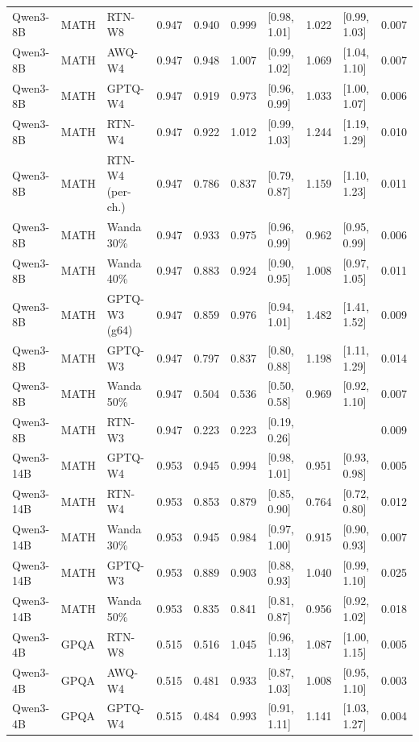 \begin{tabular}{lllrrrlrlr}
Qwen3-8B & MATH & RTN-W8 & 0.947 & 0.940 & 0.999 & [0.98, 1.01] & 1.022 & [0.99, 1.03] & 0.007 \\
Qwen3-8B & MATH & AWQ-W4 & 0.947 & 0.948 & 1.007 & [0.99, 1.02] & 1.069 & [1.04, 1.10] & 0.007 \\
Qwen3-8B & MATH & GPTQ-W4 & 0.947 & 0.919 & 0.973 & [0.96, 0.99] & 1.033 & [1.00, 1.07] & 0.006 \\
Qwen3-8B & MATH & RTN-W4 & 0.947 & 0.922 & 1.012 & [0.99, 1.03] & 1.244 & [1.19, 1.29] & 0.010 \\
Qwen3-8B & MATH & RTN-W4 (per-ch.) & 0.947 & 0.786 & 0.837 & [0.79, 0.87] & 1.159 & [1.10, 1.23] & 0.011 \\
Qwen3-8B & MATH & Wanda 30\% & 0.947 & 0.933 & 0.975 & [0.96, 0.99] & 0.962 & [0.95, 0.99] & 0.006 \\
Qwen3-8B & MATH & Wanda 40\% & 0.947 & 0.883 & 0.924 & [0.90, 0.95] & 1.008 & [0.97, 1.05] & 0.011 \\
Qwen3-8B & MATH & GPTQ-W3 (g64) & 0.947 & 0.859 & 0.976 & [0.94, 1.01] & 1.482 & [1.41, 1.52] & 0.009 \\
Qwen3-8B & MATH & GPTQ-W3 & 0.947 & 0.797 & 0.837 & [0.80, 0.88] & 1.198 & [1.11, 1.29] & 0.014 \\
Qwen3-8B & MATH & Wanda 50\% & 0.947 & 0.504 & 0.536 & [0.50, 0.58] & 0.969 & [0.92, 1.10] & 0.007 \\
Qwen3-8B & MATH & RTN-W3 & 0.947 & 0.223 & 0.223 & [0.19, 0.26] &  &  & 0.009 \\
Qwen3-14B & MATH & GPTQ-W4 & 0.953 & 0.945 & 0.994 & [0.98, 1.01] & 0.951 & [0.93, 0.98] & 0.005 \\
Qwen3-14B & MATH & RTN-W4 & 0.953 & 0.853 & 0.879 & [0.85, 0.90] & 0.764 & [0.72, 0.80] & 0.012 \\
Qwen3-14B & MATH & Wanda 30\% & 0.953 & 0.945 & 0.984 & [0.97, 1.00] & 0.915 & [0.90, 0.93] & 0.007 \\
Qwen3-14B & MATH & GPTQ-W3 & 0.953 & 0.889 & 0.903 & [0.88, 0.93] & 1.040 & [0.99, 1.10] & 0.025 \\
Qwen3-14B & MATH & Wanda 50\% & 0.953 & 0.835 & 0.841 & [0.81, 0.87] & 0.956 & [0.92, 1.02] & 0.018 \\
Qwen3-4B & GPQA & RTN-W8 & 0.515 & 0.516 & 1.045 & [0.96, 1.13] & 1.087 & [1.00, 1.15] & 0.005 \\
Qwen3-4B & GPQA & AWQ-W4 & 0.515 & 0.481 & 0.933 & [0.87, 1.03] & 1.008 & [0.95, 1.10] & 0.003 \\
Qwen3-4B & GPQA & GPTQ-W4 & 0.515 & 0.484 & 0.993 & [0.91, 1.11] & 1.141 & [1.03, 1.27] & 0.004 \\

\end{tabular}
